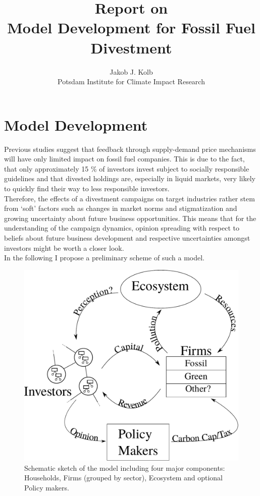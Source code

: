 \title{Report on \\ Model Development for Fossil Fuel Divestment}
\author{Jakob J. Kolb \\ Potsdam Institute for Climate Impact Research}

\maketitle

\section{Model Development}

Previous studies \cite{Ans2013} suggest that feedback through supply-demand price mechanisms will have only limited impact on fossil fuel companies. This is due to the fact, that only approximately 15 \% of investors invest subject to socially responsible guidelines \cite{SIF2014Report} and that divested holdings are, especially in liquid markets, very likely to quickly find their way to less responsible investors. \\
Therefore, the effects of a divestment campaigns on target industries rather stem from `soft' factors such as changes in market norms and stigmatization and growing uncertainty about future business opportunities. This means that for the understanding of the campaign dynamics, opinion spreading with respect to beliefs about future business development and respective uncertainties amongst investors might be worth a closer look. \\
In the following I propose a preliminary scheme of such a model.

\begin{figure}[h]
	\centering
	\includegraphics[width = .7 \textwidth]{Model_Scheme.pdf}
	\caption{Schematic sketch of the model including four major components: Households, Firms (grouped by sector), Ecosystem and optional Policy makers.}
	\label{fig:model}
\end{figure}

